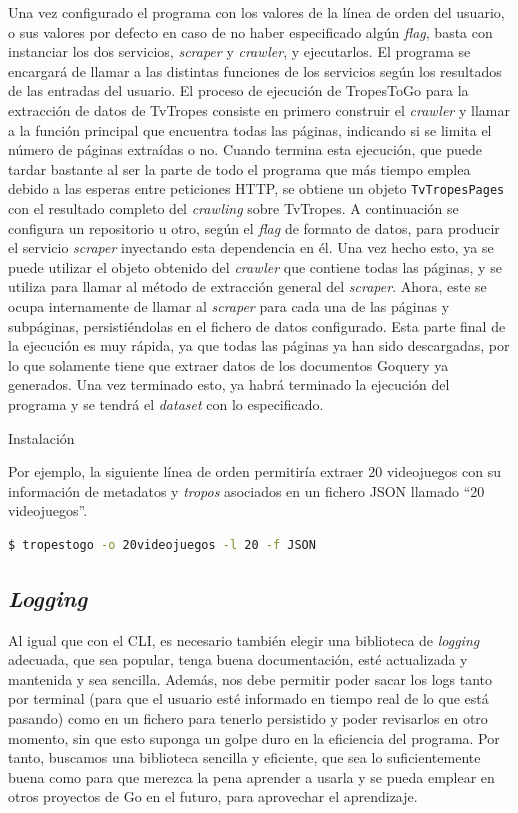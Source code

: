 Una vez configurado el programa con los valores de la línea de orden del
usuario, o sus valores por defecto en caso de no haber especificado algún
\textit{flag}, basta con instanciar los dos servicios, \textit{scraper} y
\textit{crawler}, y ejecutarlos. El programa se encargará de llamar a las
distintas funciones de los servicios según los resultados de las entradas del
usuario. El proceso de ejecución de TropesToGo para la extracción de datos de
TvTropes consiste en primero construir el \textit{crawler} y llamar a la función
principal que encuentra todas las páginas, indicando si se limita el número de
páginas extraídas o no. Cuando termina esta ejecución, que puede tardar bastante
al ser la parte de todo el programa que más tiempo emplea debido a las esperas
entre peticiones HTTP, se obtiene un objeto \texttt{TvTropesPages} con el
resultado completo del \textit{crawling} sobre TvTropes. A continuación se
configura un repositorio u otro, según el \textit{flag} de formato de datos,
para producir el servicio \textit{scraper} inyectando esta dependencia en él.
Una vez hecho esto, ya se puede utilizar el objeto obtenido del \textit{crawler}
que contiene todas las páginas, y se utiliza para llamar al método de extracción
general del \textit{scraper}. Ahora, este se ocupa internamente de llamar al
\textit{scraper} para cada una de las páginas y subpáginas, persistiéndolas en
el fichero de datos configurado. Esta parte final de la ejecución es muy rápida,
ya que todas las páginas ya han sido descargadas, por lo que solamente tiene que
extraer datos de los documentos Goquery ya generados. Una vez terminado esto, ya
habrá terminado la ejecución del programa y se tendrá el \textit{dataset} con lo
especificado.

Instalación

Por ejemplo, la siguiente línea de orden permitiría extraer 20 videojuegos con
su información de metadatos y \textit{tropos} asociados en un fichero JSON
llamado ``20 videojuegos''.
\begin{lstlisting}[language=bash]
$ tropestogo -o 20videojuegos -l 20 -f JSON
\end{lstlisting}

\subsection{\textit{Logging}}
Al igual que con el CLI, es necesario también elegir una biblioteca de
\textit{logging} adecuada, que sea popular, tenga buena documentación, esté
actualizada y mantenida y sea sencilla. Además, nos debe permitir
poder sacar los logs tanto por terminal (para que el usuario esté informado en
tiempo real de lo que está pasando) como en un fichero para tenerlo persistido y
poder revisarlos en otro momento, sin que esto suponga un golpe duro en la
eficiencia del programa. Por tanto, buscamos una biblioteca sencilla y
eficiente, que sea lo suficientemente buena como para que merezca la pena
aprender a usarla y se pueda emplear en otros proyectos de Go en el futuro, para
aprovechar el aprendizaje.

